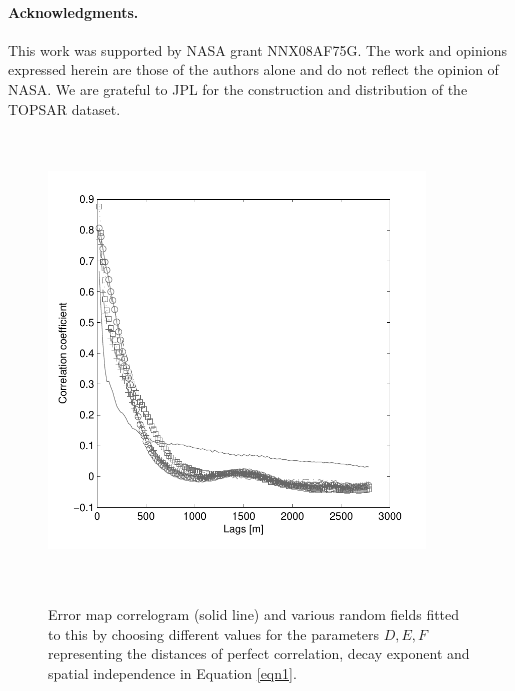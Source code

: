 \documentclass[12pt]{article}
\newcommand{\Pic}[2][0.85]{\begin{center}\texttt{[image: \#2]}
 \end{center} }
\begin{document}
\paragraph{Acknowledgments.}  This work was supported by NASA grant
NNX08AF75G.  The work and opinions expressed herein are those of the
authors alone and do not reflect the opinion of NASA.  We are grateful
to JPL for the construction and distribution of the TOPSAR dataset.

	
		

\begin{figure}[H]
\centering
	\includegraphics[width=10cm,height=12cm,keepaspectratio]{figs_pdf/mammoth_error_correl.pdf}\\       
        \caption{ Error map correlogram (solid line) and various random
          fields fitted to this by choosing different values for the
          parameters $D,E,F$ representing the distances of perfect
          correlation, decay exponent and spatial independence in
          Equation \ref{eqn1}.}
\label{fig1}  
\end{figure}
\end{document}
